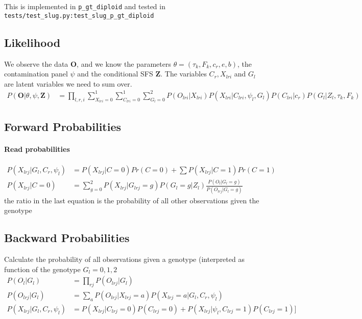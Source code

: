 \documentclass[10pt,a4paper]{article}
\begin{document}
This is implemented in \texttt{p\_gt\_diploid} and tested in \texttt{tests/test\_slug.py:test\_slug\_p\_gt\_diploid}


\subsection*{Likelihood}
We observe the data $\mathbf{O}$, and we know the parameters $\theta = (\tau_k, F_k, c_r, e,b)$, the 
contamination panel $\psi$ and the conditional SFS $\mathbf{Z}$. The variables
$C_r, X_{lri}$ and $G_l$ are latent variables we need to sum over.
\begin{align}
P(\mathbf{O} | \theta, \psi, \mathbf{Z}) &= 
\prod_{l, r, i}\sum_{X_{lri}=0}^1\sum_{C_{lri}=0}^1\sum_{G_{l}=0}^2 P(O_{lri} |X_{lri}) P(X_{lri} | C_{lri}, \psi_l, G_l) P(C_{lri} | c_r) P(G_l | Z_l, \tau_k, F_k)
\end{align}

\subsection*{Forward Probabilities}
\paragraph{Read probabilities}
\begin{align*}
 P(X_{lrj} | G_l, C_r, \psi_l) &=  P(X_{lrj} | C=0) Pr( C=0) +  \sum P(X_{lrj} | C=1) Pr(C=1) \\
 P(X_{lrj} | C=0) &= \sum_{g=0}^2 P(X_{lrj} | G_{lrj}=g)P(G_l=g | Z_l) \frac{ P(O_l | G_l=g)} {P(O_{lrj} | G_l=g) } 
\end{align*}
the ratio in the last equation is the probability of all other observations given the genotype

\subsection*{Backward Probabilities}
Calculate the probability of all observations given a genotype (interpreted as function of the genotype $G_l = 0,1,2$
\begin{align*}
P(O_{l} | G_l) &= \prod_{rj} P(O_{lrj} | G_l)\\
P(O_{lrj} | G_l) &= \sum_a P(O_{lrj}|X_{lrj}=a)  P(X_{lrj}=a | G_l, C_r, \psi_l)\\
P(X_{lrj} | G_l, C_r, \psi_l) &= P(X_{lrj} | C_{lrj}=0)P(C_{lrj}=0)  + P(X_{lrj} | \psi_l, C_{lrj}=1)P(C_{lrj}=1)]
\end{align*}
\end{document}
